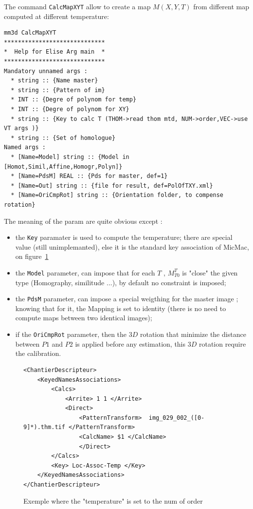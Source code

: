 \label{Comp:Evol:Map}

The command {\tt CalcMapXYT} allow to create a map $M(X,Y,T)$
from  different map computed at different temperature:

\begin{verbatim}
mm3d CalcMapXYT
*****************************
*  Help for Elise Arg main  *
*****************************
Mandatory unnamed args : 
  * string :: {Name master}
  * string :: {Pattern of im}
  * INT :: {Degre of polynom for temp}
  * INT :: {Degre of polynom for XY}
  * string :: {Key to calc T (THOM->read thom mtd, NUM->order,VEC->use VT args )}
  * string :: {Set of homologue}
Named args : 
  * [Name=Model] string :: {Model in [Homot,Simil,Affine,Homogr,Polyn]}
  * [Name=PdsM] REAL :: {Pds for master, def=1}
  * [Name=Out] string :: {file for result, def=PolOfTXY.xml}
  * [Name=OriCmpRot] string :: {Orientation folder, to compense rotation}
\end{verbatim}

The meaning of the param are quite obvious except :

\begin{itemize}
   \item the {\tt Key} paramater is used to compute the temperature; there are
         special value (still unimplemanted), else it is the standard key association
         of MicMac, on figure~\ref{Ex:Key:TempCam}

   \item the {\tt Model} parameter, can impose that for each $T$ , $ M^T_{T0}$ is "close"
         the given type (Homography, similitude ...), by default no constraint is imposed;

   \item the {\tt PdsM}  parameter, can impose a special weigthing for the master image
         ; knowing that for it, the Mapping is set  to identity (there is no need to  compute
          maps  between two identical images);
   \item if the {\tt OriCmpRot}  parameter, then the $3D$ rotation that minimize the distance between
         $P1$ and $P2$ is applied before any estimation, this $3D$ rotation require the calibration.
\end{itemize}


\begin{figure}
\begin{verbatim}
<ChantierDescripteur>
    <KeyedNamesAssociations>
        <Calcs>
            <Arrite> 1 1 </Arrite>
            <Direct>
                <PatternTransform>  img_029_002_([0-9]*).thm.tif </PatternTransform>
                <CalcName> $1 </CalcName>
                </Direct>
        </Calcs>
        <Key> Loc-Assoc-Temp </Key>
    </KeyedNamesAssociations>
</ChantierDescripteur>
\end{verbatim}
\caption{Exemple where the "temperature" is set to the num of order}
\label{Ex:Key:TempCam}
\end{figure}

